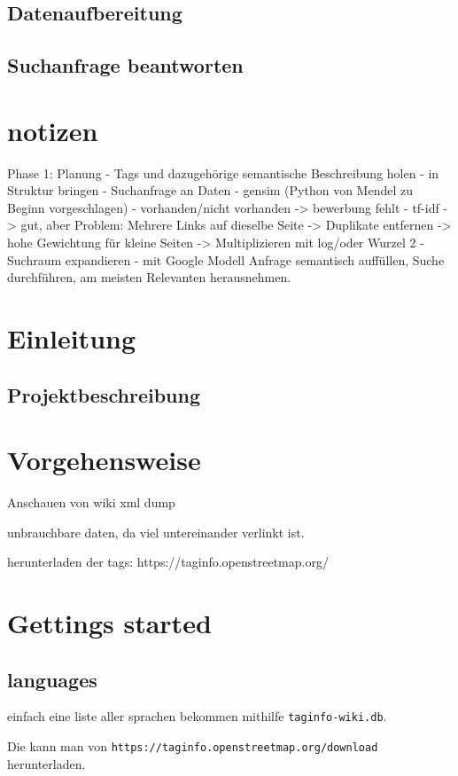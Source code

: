 \documentclass[12pt,pdftex,a4paper]{article}
\begin{document}
\subsection{Datenaufbereitung}

\subsection{Suchanfrage beantworten}

\section{notizen}
Phase 1: Planung
- Tags und dazugehörige semantische Beschreibung holen
- in Struktur bringen
- Suchanfrage an Daten 
    - gensim (Python von Mendel zu Beginn vorgeschlagen)
	- vorhanden/nicht vorhanden 
		-> bewerbung fehlt
	- tf-idf
		-> gut, aber Problem: Mehrere Links auf dieselbe Seite
			-> Duplikate entfernen
		-> hohe Gewichtung für kleine Seiten
			-> Multiplizieren mit log/oder Wurzel 2
- Suchraum expandieren
	- mit Google Modell Anfrage semantisch auffüllen, Suche durchführen, am meisten Relevanten herausnehmen.

\section{Einleitung}
\subsection{Projektbeschreibung}

\pagebreak
\section{Vorgehensweise}
Anschauen von wiki xml dump

unbrauchbare daten, da viel untereinander verlinkt ist.

herunterladen der tags: https://taginfo.openstreetmap.org/

\section{Gettings started}
\subsection{languages}
einfach eine liste aller sprachen bekommen mithilfe \texttt{taginfo-wiki.db}.

Die kann man von \texttt{https://taginfo.openstreetmap.org/download} herunterladen.
\end{document}
